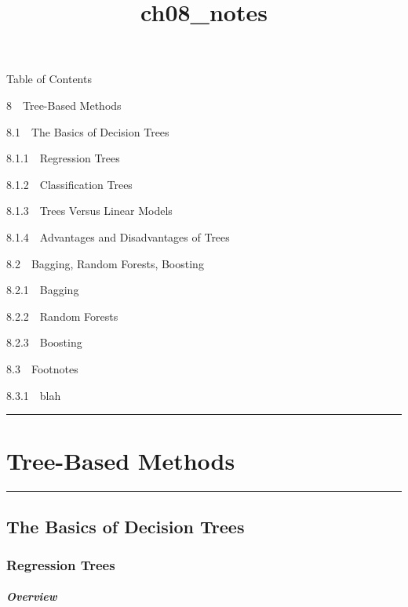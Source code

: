 \documentclass[11pt]{article}
\title{ch08\_notes}
\begin{document}
    
    
    \maketitle
    
    

    
    Table of Contents{}

{{8~~}Tree-Based Methods}

{{8.1~~}The Basics of Decision Trees}

{{8.1.1~~}Regression Trees}

{{8.1.2~~}Classification Trees}

{{8.1.3~~}Trees Versus Linear Models}

{{8.1.4~~}Advantages and Disadvantages of Trees}

{{8.2~~}Bagging, Random Forests, Boosting}

{{8.2.1~~}Bagging}

{{8.2.2~~}Random Forests}

{{8.2.3~~}Boosting}

{{8.3~~}Footnotes}

{{8.3.1~~}blah}

    \begin{center}\rule{0.5\linewidth}{\linethickness}\end{center}

\hypertarget{tree-based-methods}{%
\section{Tree-Based Methods}\label{tree-based-methods}}

\begin{center}\rule{0.5\linewidth}{\linethickness}\end{center}

    \hypertarget{the-basics-of-decision-trees}{%
\subsection{The Basics of Decision
Trees}\label{the-basics-of-decision-trees}}

    \hypertarget{regression-trees}{%
\subsubsection{Regression Trees}\label{regression-trees}}

    \hypertarget{overview}{%
\subparagraph{Overview}\label{overview}}
\end{document}
